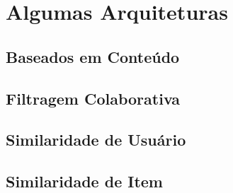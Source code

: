 \section{Algumas Arquiteturas}
\subsection{Baseados em Conteúdo}
\subsection{Filtragem Colaborativa}
\subsection{Similaridade de Usuário}
\subsection{Similaridade de Item}
